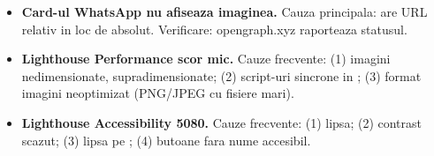 \begin{itemize}[itemsep=4pt]
  \item \textbf{Card-ul WhatsApp nu afiseaza imaginea.} Cauza principala:  are URL relativ in loc de absolut. Verificare: opengraph.xyz raporteaza statusul.
  \item \textbf{Lighthouse Performance scor mic.} Cauze frecvente: (1) imagini nedimensionate, supradimensionate; (2) script-uri sincrone in ; (3) format imagini neoptimizat (PNG/JPEG cu fisiere mari).
  \item \textbf{Lighthouse Accessibility 50\textendash{}80.} Cauze frecvente: (1)  lipsa; (2) contrast scazut; (3) lipsa  pe ; (4) butoane fara nume accesibil.
\end{itemize}
